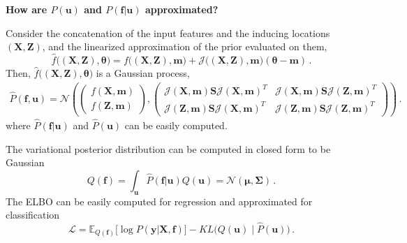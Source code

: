     \begin{frame}
        \textbf{How are \(P(\bm u)\) and \(P(\mathbf f| \bm u)\) approximated?}

        Consider the concatenation of the input features and the inducing locations \((\mathbf X, \mathbf Z)\), and the linearized approximation of the prior evaluated on them,
        \[
         \hat{f}\big((\mathbf X, \mathbf Z), \bm \theta\big) = f\big((\mathbf X, \mathbf Z), \bm m \big) + \mathcal{J}\big((\mathbf X, \mathbf Z), \bm m\big)(\bm \theta - \bm m)\,.
        \]
        Then, \(\hat{f}\big((\mathbf X, \mathbf Z), \bm \theta\big)\) is a Gaussian process,
        \[
        \begin{aligned}
             \hat{P}(\mathbf f, \bm u) = \mathcal{N}\left( 
                \begin{pmatrix}
                    f(\mathbf X, \bm m) \\ f(\mathbf Z, \bm m)
                \end{pmatrix},
                \begin{pmatrix}
                    \mathcal{J}(\mathbf X, \bm m) \bm S \mathcal{J}(\mathbf X, \bm m)^T &  \mathcal{J}(\mathbf{X}, \bm m) \bm S \mathcal{J}(\mathbf Z, \bm m)^T \\
                    \mathcal{J}(\mathbf Z, \bm m) \bm S \mathcal{J}(\mathbf X, \bm m)^T &  \mathcal{J}(\mathbf Z, \bm m) \bm S \mathcal{J}(\mathbf Z, \bm m)^T
                \end{pmatrix}
             \right)\,.
        \end{aligned}
        \]    
        where \(\hat{P}(\mathbf f| \bm u)\) and \(\hat{P}(\bm u)\) can be easily computed.
    \end{frame}
    \begin{frame}
        The variational posterior distribution can be computed in closed form to be Gaussian
        \[ 
            Q(\mathbf f) = \int_{\bm u} \hat{P}(\mathbf f | \bm u)Q(\bm u) = \mathcal{N}(\bm \mu, \bm \Sigma)\,.
        \]
        The ELBO can be easily computed for regression and approximated for classification
        \[
        \mathcal{L} = \mathbb{E}_{Q( \mathbf f)}\Big[ \log P(\mathbf y | \mathbf X,  \mathbf f) \Big] - KL\Big(Q(\bm u) \mid \hat{P}(\bm u) \Big)\,.
        \]
    \end{frame}